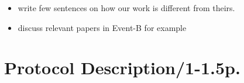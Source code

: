 \documentclass{llncs}
\begin{document}

\begin{itemize}
	\item write few sentences on how our work is different from theirs.
	\item discuss relevant papers in Event-B for example \cite{HOANG2009879}
\end{itemize}


\newpage

\section{Protocol Description/1-1.5p.}
\end{document}
